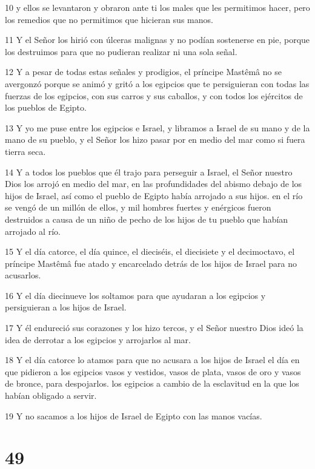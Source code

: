 \par 10 y ellos se levantaron y obraron ante ti los males que les permitimos hacer, pero los remedios que no permitimos que hicieran sus manos.
\par 11 Y el Señor los hirió con úlceras malignas y no podían sostenerse en pie, porque los destruimos para que no pudieran realizar ni una sola señal.
\par 12 Y a pesar de todas estas señales y prodigios, el príncipe Mastêmâ no se avergonzó porque se animó y gritó a los egipcios que te persiguieran con todas las fuerzas de los egipcios, con sus carros y sus caballos, y con todos los ejércitos de los pueblos de Egipto.
\par 13 Y yo me puse entre los egipcios e Israel, y libramos a Israel de su mano y de la mano de su pueblo, y el Señor los hizo pasar por en medio del mar como si fuera tierra seca.
\par 14 Y a todos los pueblos que él trajo para perseguir a Israel, el Señor nuestro Dios los arrojó en medio del mar, en las profundidades del abismo debajo de los hijos de Israel, así como el pueblo de Egipto había arrojado a sus hijos. en el río se vengó de un millón de ellos, y mil hombres fuertes y enérgicos fueron destruidos a causa de un niño de pecho de los hijos de tu pueblo que habían arrojado al río.
\par 15 Y el día catorce, el día quince, el dieciséis, el diecisiete y el decimoctavo, el príncipe Mastêmâ fue atado y encarcelado detrás de los hijos de Israel para no acusarlos.
\par 16 Y el día diecinueve los soltamos para que ayudaran a los egipcios y persiguieran a los hijos de Israel.
\par 17 Y él endureció sus corazones y los hizo tercos, y el Señor nuestro Dios ideó la idea de derrotar a los egipcios y arrojarlos al mar.
\par 18 Y el día catorce lo atamos para que no acusara a los hijos de Israel el día en que pidieron a los egipcios vasos y vestidos, vasos de plata, vasos de oro y vasos de bronce, para despojarlos. los egipcios a cambio de la esclavitud en la que los habían obligado a servir.
\par 19 Y no sacamos a los hijos de Israel de Egipto con las manos vacías.

\chapter{49}

